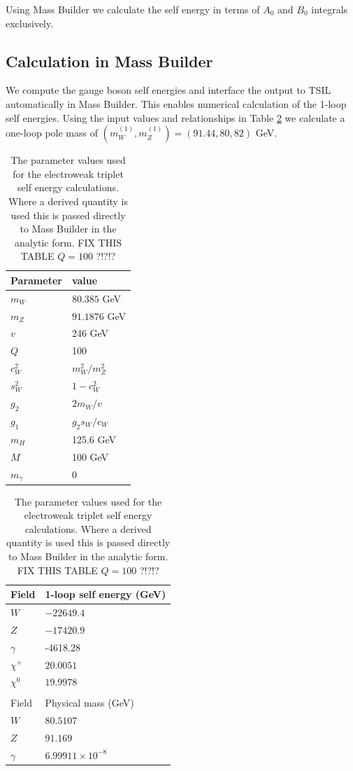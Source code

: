 \documentclass[11pt]{article}
\begin{document}
Using Mass Builder we calculate the self energy in terms of $A_0$ and $B_0$ integrals exclusively.



\subsection{Calculation in Mass Builder}

We compute the gauge boson self energies and interface the output to TSIL automatically in Mass Builder.  This enables numerical calculation of the 1-loop self energies.  Using the input values and relationships in Table \ref{table:input_params} we calculate a one-loop pole mass of $(m_W^{(1)},m_Z^{(1)}) = (91.44,80,82)$ GeV.

\begin{table}[tp]
\caption{The parameter values used for the electroweak triplet self energy calculations.  Where a derived quantity is used this is passed directly to Mass Builder in the analytic form. FIX THIS TABLE $Q=100$ ?!?!?}\label{table:input_params}
\centering
\begin{tabular}{l l}
\hline
Parameter & value\\
\hline
$m_W$ & $80.385$ GeV \\
$m_Z$ & $91.1876$ GeV \\
$v$ & 246 GeV \\
$Q$ & 100 \\
$c_W^2$ & $m^2_W/m^2_Z$ \\
$s_W^2$ & $1-c^2_W$ \\
$g_2$ & $2m_W/v$\\
$g_1$ & $g_2 s_W/c_W$\\
$m_H$ & 125.6 GeV\\
$M$ & 100 GeV\\
$m_{\gamma}$ & 0 \\
\hline\end{tabular}
\hspace{3cm}
\begin{tabular}{l l}
\hline
Field & 1-loop self energy (GeV)\\
\hline
$W$ & $-22649.4$ \\
$Z$ & $-17420.9$  \\
$\gamma$ & -4618.28 \\
$\chi^+$ & $20.0051$ \\
$\chi^0$ & $19.9978$ \\
&\\
\hline
Field & Physical mass (GeV)\\
\hline
$W$ & $80.5107$ \\
$Z$ & $91.169$  \\
$\gamma$ & $6.99911\times 10^{-8}$\\
\hline\end{tabular}
\end{table}
\end{document}
